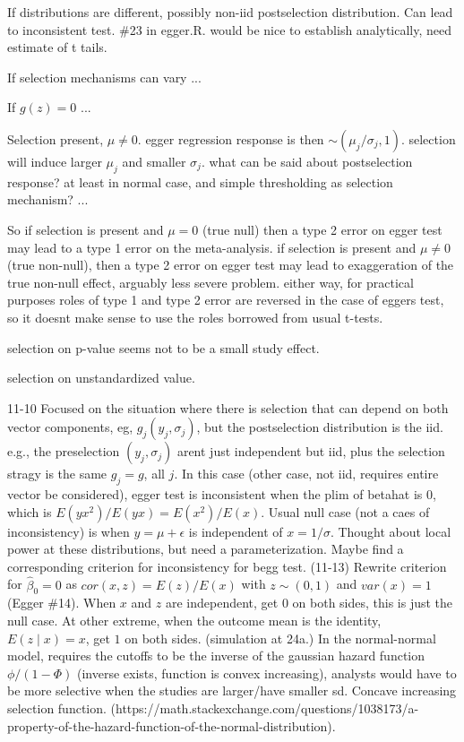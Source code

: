 \documentclass{article}
\begin{document}
If distributions are different, possibly non-iid postselection
distribution. Can lead to inconsistent test. \#23 in egger.R. would be
nice to establish analytically, need estimate of t tails.

If selection mechanisms can vary ...

If $g(z)=0$ ...

Selection present, $\mu\neq 0$. egger regression response is then
$\sim (\mu_j/\sigma_j,1)$. selection will induce larger $\mu_j$ and
smaller $\sigma_j$. what can be said about postselection response? at
least in normal case, and simple thresholding as selection mechanism? ...

So if selection is present and $\mu=0$ (true null) then a type 2 error
on egger test may lead to a type 1 error on the meta-analysis. if
selection is present and $\mu\neq 0$ (true non-null), then a type 2
error on egger test may lead to exaggeration of the true non-null
effect, arguably less severe problem. either way, for practical
purposes roles of type 1 and type 2 error are reversed in the case of
eggers test, so it doesnt make sense to use the roles borrowed from
usual t-tests.

selection on p-value seems not to be a small study effect.

selection on unstandardized value.


11-10 Focused on the situation where there is selection that can
depend on both vector components, eg, $g_j(y_j,\sigma_j)$, but the
postselection distribution is the iid. e.g., the preselection
$(y_j,\sigma_j)$ arent just independent but iid, plus the selection
stragy is the same $g_j=g$, all $j$.  In this case (other case, not
iid, requires entire vector be considered), egger test is inconsistent
when the plim of betahat is 0, which is
$E(yx^2)/E(yx)=E(x^2)/E(x)$. Usual null case (not a caes of
inconsistency) is when $y=\mu+\epsilon$ is independent of
$x=1/\sigma$. Thought about local power at these distributions, but
need a parameterization. Maybe find a corresponding criterion for
inconsistency for begg test. (11-13) Rewrite criterion for
$\hat{\beta}_0=0$ as $cor(x,z)=E(z)/E(x)$ with $z\sim (0,1)$ and
$var(x)=1$ (Egger \#14). When $x$ and $z$ are independent, get $0$ on
both sides, this is just the null case. At other extreme, when the
outcome mean is the identity, $E(z\mid x)=x$, get $1$ on both
sides. (simulation at 24a.) In the normal-normal model, requires the
cutoffs to be the inverse of the gaussian hazard function
$\phi/(1-\Phi)$ (inverse exists, function is convex increasing),
analysts would have to be more selective when the studies are
larger/have smaller sd. Concave increasing selection
function. (https://math.stackexchange.com/questions/1038173/a-property-of-the-hazard-function-of-the-normal-distribution).
\end{document}
